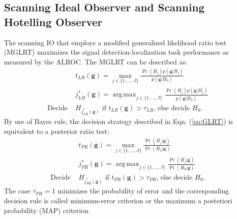 \documentclass[journal]{IEEEtran}
\DeclareMathOperator*{\argmax}{arg\,max}
\begin{document}
\subsection{Scanning Ideal Observer and Scanning Hotelling Observer}
The scanning IO that employs a modified generalized likelihood ratio test (MGLRT) maximizes the signal detection-localization task performance {as measured by the ALROC. }
The MGLRT\cite{khurd2005decision} can be described as:
\begin{equation}\label{eq:GLRT}
\begin{split}
&t_{{LR}}(\mathbf{g})  =  \max_{j\in\{1,...,J\}} \frac{\Pr(H_j)p(\mathbf{g}|H_j)}{p(\mathbf{g}|H_0)} \\
&j_{{LR}}^*(\mathbf{g}) =\argmax_{j\in\{1,...,J\}}\frac{\Pr(H_j)p(\mathbf{g}|H_j)}{p(\mathbf{g}|H_0)}\\
\text{Decide }&\text{$H_{j_{{LR}}^*(\mathbf{g})}$ if $t_{{LR}}(\mathbf{g}) > \tau_{{LR}}$, else decide $H_0$}.
\end{split}
\end{equation}
By use of Bayes rule, the decision strategy described in Eqn. (\ref{eq:GLRT}) is equivalent to a posterior ratio test\cite{zhou2019learning_lroc}:
\begin{equation}\label{eq:GLRT2}
\begin{split}
&t_{{PR}}(\mathbf{g}) =  \max_{j\in\{1,...,J\}} \frac{\Pr(H_j|\mathbf{g})}{\Pr(H_0|\mathbf{g})}  \\
&j_{{PR}}^*(\mathbf{g}) =\argmax_{j\in\{1,...,J\}}\frac{\Pr(H_j|\mathbf{g})}{\Pr(H_0|\mathbf{g})} \\
\text{Decide } &\text{$H_{j_{{PR}}^*(\mathbf{g})}$ if $t_{{PR}}(\mathbf{g}) > \tau_{{PR}}$, else decide $H_0$}.
\end{split}
\end{equation}
{The case $\tau_{PR} = 1$ minimizes the probability of error
and the corresponding decision rule is called minimum-error criterion or the maximum a posteriori probability (MAP) criterion\cite{barrett2013foundations}.}
\end{document}

